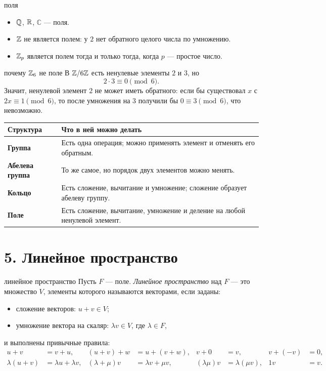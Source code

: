 \begin{examplebox}{поля}
\begin{itemize}
    \item $\mathbb{Q}$, $\mathbb{R}$, $\mathbb{C}$ --- поля.
    \item $\mathbb{Z}$ не является полем: у $2$ нет обратного целого числа по умножению.
    \item $\mathbb{Z}_p$ является полем тогда и только тогда, когда $p$ --- простое число.
\end{itemize}
\end{examplebox}

\begin{warningbox}{почему $\mathbb{Z}_6$ не поле}
В $\mathbb{Z}/6\mathbb{Z}$ есть ненулевые элементы $2$ и $3$, но
\[
    2\cdot 3\equiv 0\pmod 6.
\]
Значит, ненулевой элемент $2$ не может иметь обратного: если бы существовал $x$ с $2x\equiv 1\pmod 6$, то после умножения на $3$ получили бы $0\equiv 3\pmod 6$, что невозможно.
\end{warningbox}


\begin{center}
\begin{tabularx}{0.98\textwidth}{>{\bfseries}p{}X}
\toprule
Структура & Что в ней можно делать \\
\midrule
Группа & Есть одна операция; можно применять элемент и отменять его обратным. \\
Абелева группа & То же самое, но порядок двух элементов можно менять. \\
Кольцо & Есть сложение, вычитание и умножение; сложение образует абелеву группу. \\
Поле & Есть сложение, вычитание, умножение и деление на любой ненулевой элемент. \\
\bottomrule
\end{tabularx}
\end{center}

\newpage

\section*{5. Линейное пространство}

\begin{defbox}{линейное пространство}
Пусть $F$ --- поле. \emph{Линейное пространство} над $F$ --- это множество $V$, элементы которого называются векторами, если заданы:
\begin{itemize}
    \item сложение векторов: $u+v\in V$;
    \item умножение вектора на скаляр: $\lambda v\in V$, где $\lambda\in F$,
\end{itemize}
и выполнены привычные правила:
\begin{align*}
    u+v&=v+u, & (u+v)+w&=u+(v+w), & v+0&=v, & v+(-v)&=0,\\
    \lambda(u+v)&=\lambda u+\lambda v, & (\lambda+\mu)v&=\lambda v+\mu v, & (\lambda\mu)v&=\lambda(\mu v), & 1v&=v.
\end{align*}
\end{defbox}

